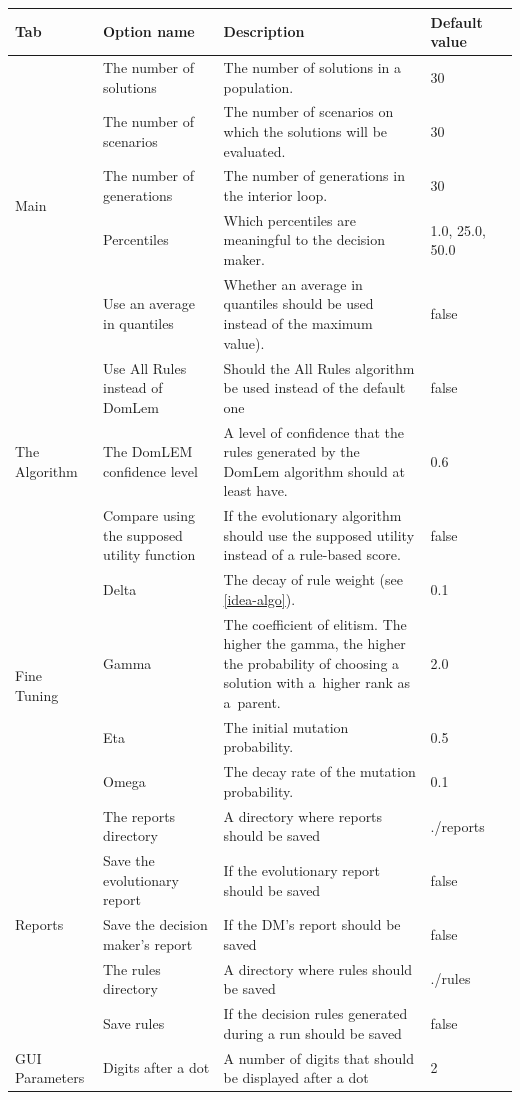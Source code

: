 \begin{table}[htb]
  \centering
  \begin{tabular}{l p{3.5cm} p{6.5cm} l l}
    \hline
    Tab & Option name & Description & Default value \\
    \hline
    \hline
    \multirow{5}{*}{Main}
    & The number of solutions & The number of solutions in a population. & 30 \\
    & The number of scenarios & The number of scenarios on which the solutions will be evaluated.  & 30 \\
    & The number of generations & The number of generations in the interior loop. & 30 \\
    & Percentiles & Which percentiles are meaningful to the decision maker. & 1.0, 25.0, 50.0  \\
    & Use an average in quantiles & Whether an average in quantiles should be used instead of
    the maximum value). & false  \\
    \hline
    \multirow{3}{*}{The Algorithm}
    & Use All Rules instead of DomLem & Should the All Rules algorithm be used
    instead of the default one & false \\
    & The DomLEM confidence level & A level of confidence that the rules generated by the
    DomLem algorithm should at least have. & 0.6 \\
    & Compare using the supposed utility function & If the evolutionary algorithm should use the
    supposed utility instead of a rule-based score. & false \\
    \hline
    \multirow{4}{*}{Fine Tuning} 
    & Delta & The decay of rule weight (see \ref{idea-algo}). & 0.1  \\
    & Gamma & The coefficient of elitism. The higher the gamma, the
    higher the probability of choosing a solution with a~higher rank as
    a~parent. & 2.0  \\ 
    & Eta & The initial mutation probability.  & 0.5    \\
    & Omega & The decay rate of the mutation probability. & 0.1  \\
    \hline
    \multirow{5}{*}{Reports} 
    & The reports directory & A directory where reports should be saved &
    ./reports  \\
    & Save the evolutionary report & If the evolutionary report should be
    saved & false \\
    & Save the decision maker's report & If the DM's report should be
    saved & false \\
    & The rules directory & A directory where rules should be saved &
    ./rules  \\
    & Save rules & If the decision rules generated during a run should be
    saved & false \\
    \hline
    \multirow{1}{*}{GUI Parameters}
    & Digits after a dot & A number of digits that should be displayed after a
    dot & 2 \\    
    \hline
  \end{tabular}
\end{table}


